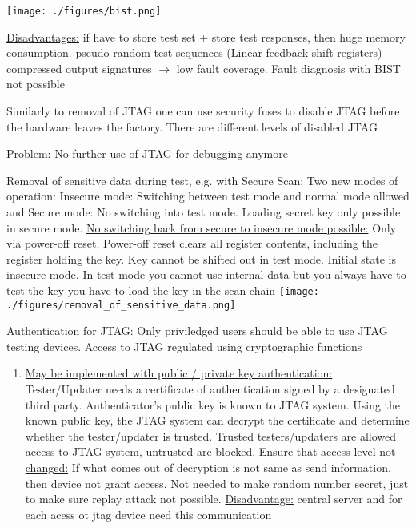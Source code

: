 \documentclass[landscape, a4paper]{article}
\begin{document}
\begin{minipage}[t]{0.2\linewidth}
\begin{betterlist}
\begin{enumerate}
\begin{betterlist}
				\texttt{[image: ./figures/bist.png]}
				\item Similarly to removal of JTAG one can use security fuses to disable JTAG before the hardware leaves the factory. There are different levels of disabled JTAG
				\item \underline{Problem:} No further use of JTAG for debugging anymore
			\end{betterlist}
			\item \alert{Removal of sensitive data during test, e.g. with Secure Scan:} Two new modes of operation: \alert{Insecure mode:} Switching between test mode and normal mode allowed and \alert{Secure mode:} No switching into test mode. Loading secret key only possible in secure mode. \uline{No switching back from secure to insecure mode possible:} Only via power-off reset. Power-off reset clears all register contents, including the register holding the key. Key cannot be shifted out in test mode. Initial state is insecure mode. In test mode you cannot use internal data but you always have to test the key you have to load the key in the scan chain
			\texttt{[image: ./figures/removal\_of\_sensitive\_data.png]}
			\item \alert{Authentication for JTAG:} Only priviledged users should be able to use JTAG testing devices. Access to JTAG regulated using cryptographic functions
			\begin{enumerate}
				\item \underline{May be implemented with public / private key authentication:} Tester/Updater needs a certificate of authentication signed by a designated third party. Authenticator’s public key is known to JTAG system. Using the known public key, the JTAG system can decrypt the certificate and determine whether the tester/updater is trusted. Trusted testers/updaters are allowed access to JTAG system, untrusted are blocked. \underline{Ensure that access level not changed:} If what comes out of decryption is not same as send information, then device not grant access. Not needed to make random number secret, just to make sure \alert{replay attack} not possible. \underline{Disadvantage:} central server and for each acess ot jtag device need this communication



\end{enumerate}
\end{enumerate}
\end{betterlist}
\end{minipage}
\end{document}
